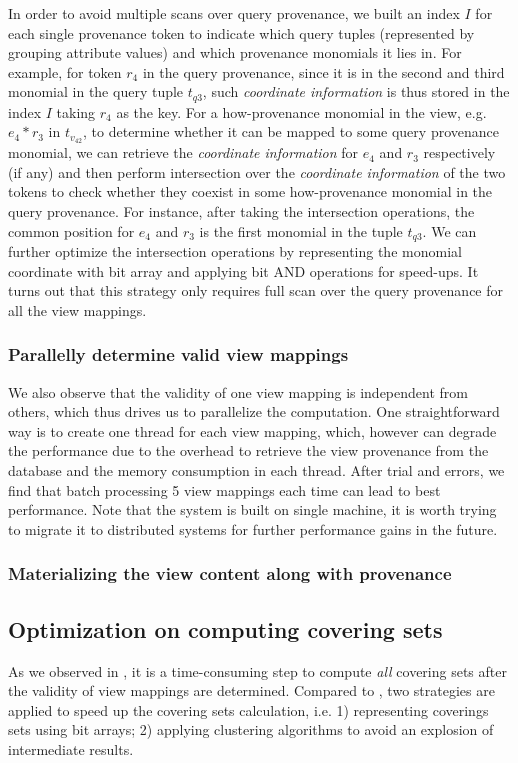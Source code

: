\begin{example}
In order to avoid multiple scans over query provenance, we built an index $I$ for each single provenance token to indicate which query tuples (represented by grouping attribute values) and which provenance monomials it lies in. For example, for token $r_4$ in the query provenance, since it is in the second and third monomial in the query tuple $t_{q3}$, such {\em coordinate information} is thus stored in the index $I$ taking $r_4$ as the key. For a how-provenance monomial in the view, e.g. $e_4*r_3$ in $t_{v_42}$, to determine whether it can be mapped to some query provenance monomial, we can retrieve the {\em coordinate information} for $e_4$ and $r_3$ respectively (if any) and then perform intersection over the {\em coordinate information} of the two tokens to check whether they coexist in some how-provenance monomial in the query provenance. For instance, after taking the intersection operations, the common position for $e_4$ and $r_3$ is the first monomial in the tuple $t_{q3}$. We can further optimize the intersection operations by representing the monomial coordinate with bit array and applying bit AND operations for speed-ups. It turns out that this strategy only requires full scan over the query provenance for all the view mappings.

\subsubsection{Parallelly determine valid view mappings}
We also observe that the validity of one view mapping is independent from others, which thus drives us to parallelize the computation. One straightforward way is to create one thread for each view mapping, which, however can degrade the performance due to the overhead to retrieve the view provenance from the database and the memory consumption in each thread. After trial and errors, we find that batch processing 5 view mappings each time can lead to best performance. Note that the system is built on single machine, it is worth trying to migrate it to distributed systems for further performance gains in the future.

\subsubsection{Materializing the view content along with provenance}


\subsection{Optimization on computing covering sets}
As we observed in \cite{wu2018data}, it is a time-consuming step to compute {\em all} covering sets after the validity of view mappings are determined. Compared to \cite{wu2018data}, two strategies are applied to speed up the covering sets calculation, i.e. 1) representing coverings sets using bit arrays; 2) applying clustering algorithms to avoid an explosion of intermediate results. 


\end{example}
